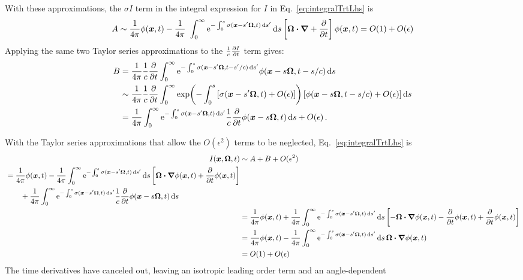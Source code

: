 With these approximations, the $\sigma I$ term in the integral expression for
$I$ in Eq.~\eqref{eq:integralTrtLhs} is
\begin{equation*}
  A \sim \frac{1}{4\pi}\phi(\bm{x}, t)
- \frac{1}{4\pi}\ \int_{0}^{\infty} \mathop{}\!\mathrm{e}^{-\int_{0}^{s} \sigma(\bm{x}-s'\bm{\Omega}, t) \mathop{}\!\mathrm{d} s'}
\mathop{}\!\mathrm{d} s
\left[ \bm{\Omega} \bm{\cdot} \bm{\nabla} + \frac{\partial }{\partial t} \right]\phi(\bm{x}, t)
=  O(1) + O(\epsilon)
\end{equation*}
Applying the same two Taylor series approximations to the $\frac1c\frac{\partial I}{\partial t}$
term gives:
\begin{align*}
  B &=
  \frac{1}{4\pi}\frac{1}{c} \pder{}{t} \int_{0}^{\infty}
  \eexp^{ -\int_{0}^{s} \sigma(\vec{x}-s'\vec{\Omega}, t-s'/c) \ud s'}
  \phi(\vec{x} - s \vec{\Omega}, t-s/c)
  \ud s
\\
  &\sim
  \frac{1}{4\pi}\frac{1}{c} \pder{}{t} \int_{0}^{\infty}
  \expp{ -\int_{0}^{s} \left[ \sigma(\vec{x}-s'\vec{\Omega}, t) +
  O(\epsiloncolor{\epsilon}) \right]}
  \left[ \phi(\vec{x} - s \vec{\Omega}, t-s/c) + O(\epsiloncolor{\epsilon}) \right]
  \ud s
\\
&= \frac{1}{4\pi} \int_{0}^{\infty}
  \eexp^{ -\int_{0}^{s} \sigma(\vec{x}-s'\vec{\Omega},t) \ud s'}
 \frac{1}{c} \pder{}{t} \phi(\vec{x} - s \vec{\Omega}, t)
  \ud s
  + O(\epsiloncolor{\epsilon})\,.
\end{align*}

With the Taylor series approximations that allow the $O(\epsilon^2)$ terms to
be neglected, Eq.~\eqref{eq:integralTrtLhs} is
\begin{align*}
  I(\vec{x}, \vec{\Omega}, t) 
  &\sim A + B + O(\epsiloncolor{\epsilon^2}) 
  \\
  \begin{split}
  &= \frac{1}{4\pi}\phi(\vec{x}, t)
- \frac{1}{4\pi}\int_{0}^{\infty} \eexp^{-\int_{0}^{s} \sigma(\vec{x}-s'\vec{\Omega}, t) \ud s'}
\ud s
\left[ \vec{\Omega} \vd \del\phi(\vec{x}, t) + \pder{}{t}\phi(\vec{x}, t)
\right]
\\
&\qquad+ \frac{1}{4\pi} \int_{0}^{\infty}
  \eexp^{ -\int_{0}^{s} \sigma(\vec{x}-s'\vec{\Omega},t) \ud s'}
 \frac{1}{c} \pder{}{t} \phi(\vec{x} - s \vec{\Omega}, t)
  \ud s
  \end{split}
  \\
  &= \frac{1}{4\pi}\phi(\vec{x}, t)
  + \frac{1}{4\pi}\int_{0}^{\infty} \eexp^{-\int_{0}^{s}
  \sigma(\vec{x}-s'\vec{\Omega}, t) \ud s'} \ud s \left[ - \vec{\Omega} \vd
  \del\phi(\vec{x}, t) - \pder{}{t}\phi(\vec{x}, t)
  + \pder{}{t}\phi(\vec{x}, t)
  \right]
  \\
  &= \frac{1}{4\pi}\phi(\vec{x}, t)
  - \frac{1}{4\pi}\int_{0}^{\infty} \eexp^{-\int_{0}^{s}
  \sigma(\vec{x}-s'\vec{\Omega}, t) \ud s'} \ud s \,
  \vec{\Omega} \vd \del\phi(\vec{x}, t)
  \\
  &= O(1) + O(\epsiloncolor{\epsilon})
\end{align*}
The time derivatives have canceled out, leaving an isotropic leading order
term and an angle-dependent 

